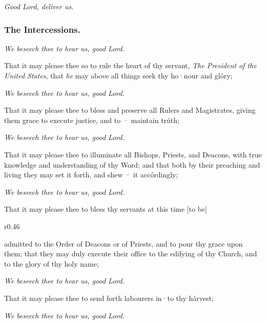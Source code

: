 \centerline{\emph{Good Lord, deliver us.}}


\subsubsection{The Intercessions.}

\centerline{\emph{We beseech thee to hear us, good Lord.}}

That it may please thee so to rule the heart of thy servant, \emph{The President of the United States}, that \emph{he} may above all things seek thy ho·nour and glóry; %

\centerline{\emph{We beseech thee to hear us, good Lord.}}

That it may please thee to bless and preserve all Rulers and Magistrates, giving them grace to execute justice, and to · maintain trúth;

\centerline{\emph{We beseech thee to hear us, good Lord.}}

That it may please thee to illuminate all Bishops, Priests, and Deacons, with true knowledge and understanding of thy Word; and that both by their preaching and living they may set it forth, and shew · it accórdingly;

\centerline{\emph{We beseech thee to hear us, good Lord.}}

\begin{leftbar}
That it may please thee to bless thy servants at this time [to be]\begin{wrapfigure}{r}{0.46\textwidth}{\footnotesize{}\par}\end{wrapfigure} admitted to the Order of Deacons or of Priests, and to pour thy grace upon them; that they may duly execute their office to the edifying of thy Church, and to the glory of thy holy name; %

\centerline{\emph{We beseech thee to hear us, good Lord.}}
\end{leftbar}
That it may please thee to send forth labourers in·to thy hárvest;

\centerline{\emph{We beseech thee to hear us, good Lord.}}

